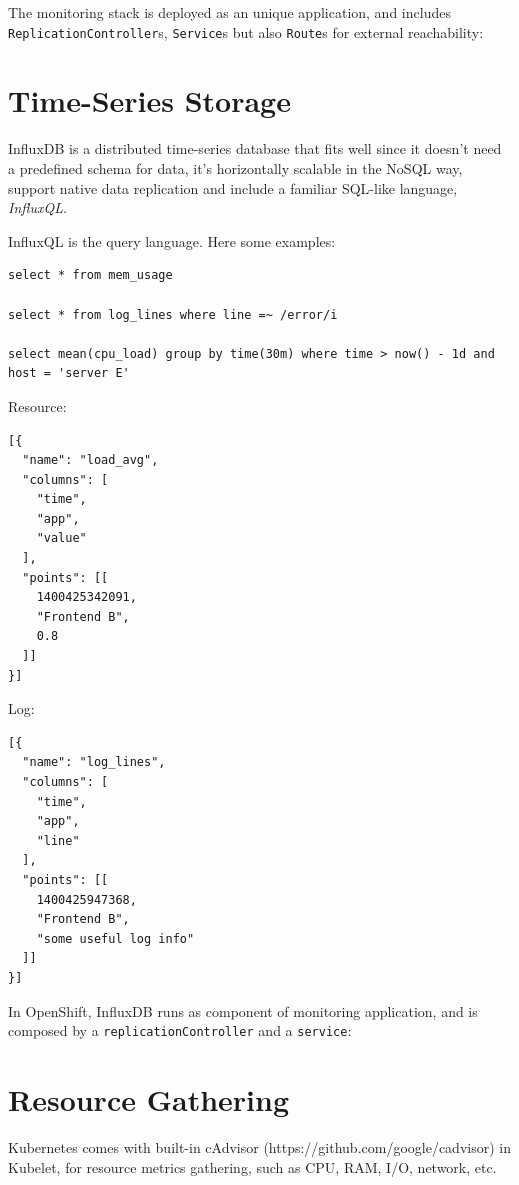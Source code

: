 The monitoring stack is deployed as an unique application, and includes
\texttt{ReplicationController}s, \texttt{Service}s but also
\texttt{Route}s for external reachability:

\section{Time-Series Storage}\label{time-series-storage}

InfluxDB is a distributed time-series database that fits well since it
doesn't need a predefined schema for data, it's horizontally scalable
in the NoSQL way, support native data replication and include a familiar
SQL-like language, \emph{InfluxQL}.

InfluxQL is the query language. Here some examples:

\begin{verbatim}
select * from mem_usage

select * from log_lines where line =~ /error/i

select mean(cpu_load) group by time(30m) where time > now() - 1d and host = 'server E'
\end{verbatim}

Resource:

\begin{verbatim}
[{
  "name": "load_avg",
  "columns": [
    "time",
    "app",
    "value"
  ],
  "points": [[
    1400425342091,
    "Frontend B",
    0.8
  ]]
}]
\end{verbatim}

Log:

\begin{verbatim}
[{
  "name": "log_lines",
  "columns": [
    "time",
    "app",
    "line"
  ],
  "points": [[
    1400425947368,
    "Frontend B",
    "some useful log info"
  ]]
}]
\end{verbatim}

In OpenShift, InfluxDB runs as component of monitoring application, and
is composed by a \texttt{replicationController} and a \texttt{service}:

\section{Resource Gathering}\label{resource-gathering}

Kubernetes comes with built-in cAdvisor (https://github.com/google/cadvisor) in Kubelet, for resource metrics gathering, such as CPU, RAM, I/O, network, etc.

